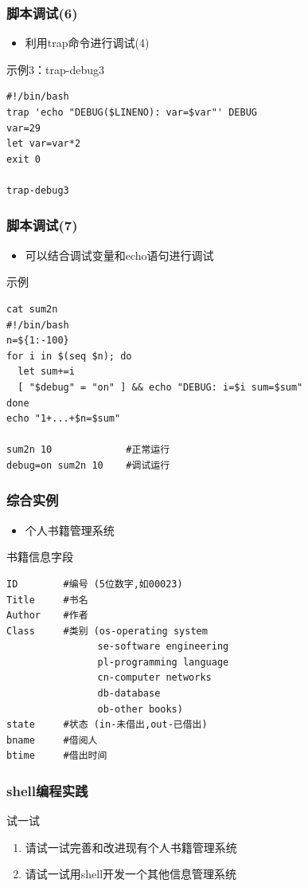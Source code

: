 \documentclass[xcolor=svgnames,presentation]{beamer}
\begin{document}
\begin{frame}[fragile]
\frametitle{脚本调试(6)}
\label{sec-1-3-29}
\begin{itemize}

\item 利用trap命令进行调试(4)
\label{sec-1-3-29-1}%
\end{itemize} %
\begin{exampleblock}{示例3：trap-debug3}
\label{sec-1-3-29-2}


\begin{verbatim}
#!/bin/bash
trap 'echo "DEBUG($LINENO): var=$var"' DEBUG
var=29
let var=var*2
exit 0

trap-debug3
\end{verbatim}
\end{exampleblock}
\end{frame}
\begin{frame}[fragile]
\frametitle{脚本调试(7)}
\label{sec-1-3-30}
\begin{itemize}

\item 可以结合调试变量和echo语句进行调试
\label{sec-1-3-30-1}%
\end{itemize} %
\begin{exampleblock}{示例}
\label{sec-1-3-30-2}


\begin{verbatim}
cat sum2n
#!/bin/bash
n=${1:-100}
for i in $(seq $n); do
  let sum+=i
  [ "$debug" = "on" ] && echo "DEBUG: i=$i sum=$sum"
done
echo "1+...+$n=$sum"

sum2n 10             #正常运行
debug=on sum2n 10    #调试运行
\end{verbatim}
\end{exampleblock}
\end{frame}
\begin{frame}[fragile]
\frametitle{综合实例}
\label{sec-1-3-31}
\begin{itemize}

\item 个人书籍管理系统
\label{sec-1-3-31-1}%
\end{itemize} %
\begin{exampleblock}{书籍信息字段}
\label{sec-1-3-31-2}


\begin{verbatim}
ID        #编号 (5位数字,如00023)
Title     #书名
Author    #作者
Class     #类别 (os-operating system
                se-software engineering
                pl-programming language
                cn-computer networks
                db-database
                ob-other books)
state     #状态 (in-未借出,out-已借出)
bname     #借阅人
btime     #借出时间
\end{verbatim}
\end{exampleblock}
\end{frame}
\begin{frame}
\frametitle{shell编程实践}
\label{sec-1-3-32}
\begin{block}{试一试}
\label{sec-1-3-32-1}

\begin{enumerate}
\item 请试一试完善和改进现有个人书籍管理系统
\item 请试一试用shell开发一个其他信息管理系统
\end{enumerate}
\end{block}
\end{frame}
\end{document}
